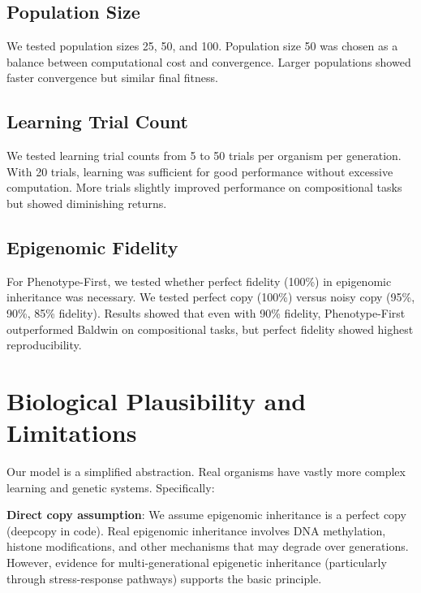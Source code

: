 \documentclass[twocolumn]{article}
\begin{document}
\subsection*{Population Size}

We tested population sizes 25, 50, and 100. Population size 50 was chosen as a balance between computational cost and convergence. Larger populations showed faster convergence but similar final fitness.

\subsection*{Learning Trial Count}

We tested learning trial counts from 5 to 50 trials per organism per generation. With 20 trials, learning was sufficient for good performance without excessive computation. More trials slightly improved performance on compositional tasks but showed diminishing returns.

\subsection*{Epigenomic Fidelity}

For Phenotype-First, we tested whether perfect fidelity (100\%) in epigenomic inheritance was necessary. We tested perfect copy (100\%) versus noisy copy (95\%, 90\%, 85\% fidelity). Results showed that even with 90\% fidelity, Phenotype-First outperformed Baldwin on compositional tasks, but perfect fidelity showed highest reproducibility.


\section*{Biological Plausibility and Limitations}

Our model is a simplified abstraction. Real organisms have vastly more complex learning and genetic systems. Specifically:

\textbf{Direct copy assumption}: We assume epigenomic inheritance is a perfect copy (deepcopy in code). Real epigenomic inheritance involves DNA methylation, histone modifications, and other mechanisms that may degrade over generations. However, evidence for multi-generational epigenetic inheritance (particularly through stress-response pathways) supports the basic principle.
\end{document}
